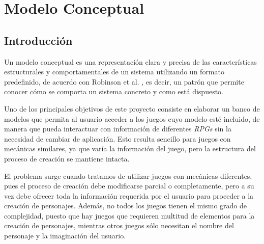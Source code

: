 

\section{Modelo Conceptual} \label{Modelo_conceptual}
\subsection{Introducción}
Un modelo conceptual es una representación clara y precisa de las características estructurales y comportamentales de un sistema 
utilizando un formato predefinido, de acuerdo con Robinson et al. \autocite*{Robinson2016}, es decir, un patrón que permite 
conocer cómo se comporta un sistema concreto y como está dispuesto. \medskip

Uno de los principales objetivos de este proyecto consiste en elaborar un banco de modelos que permita al usuario 
acceder a los juegos cuyo modelo esté incluido, de manera que pueda interactuar con información de diferentes \textit{RPGs} 
sin la necesidad de cambiar de aplicación. Esto resulta sencillo para juegos con mecánicas similares, ya que varía la información
del juego, pero la estructura del proceso de creación se mantiene intacta.\medskip 

El problema surge cuando tratamos de utilizar juegos con mecánicas diferentes, pues el proceso de creación debe 
modificarse parcial o completamente, pero a su vez debe ofrecer toda la información requerida por el usuario para 
proceder a la creación de personajes. Además, no todos los juegos tienen el mismo grado de complejidad, puesto que 
hay juegos que requieren multitud de elementos para la creación de personajes, mientras otros juegos sólo necesitan 
el nombre del personaje y la imaginación del usuario. \medskip

